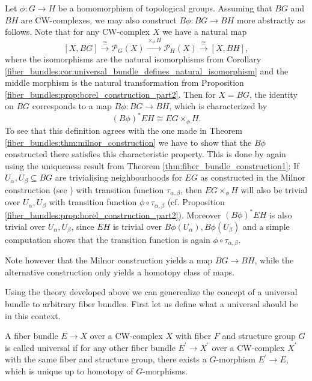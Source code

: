 \begin{remark}
    Let $\phi \colon G \to H$ be a homomorphism of topological groups. Assuming that $BG$ and $BH$ are CW-complexes, we may also construct $B \phi \colon BG \to BH$ more abstractly as follows. Note that for any CW-complex $X$ we have a natural map 
    \[
    [X,BG] \xrightarrow{\cong} \mathcal{P}_G(X) \xrightarrow{\times_\phi H} \mathcal{P}_H(X) \xrightarrow{\cong} [X,BH],
    \]
    where the isomorphisms are the natural isomorphisms from Corollary \ref{fiber_bundles:cor:universal_bundle_defines_natural_isomorphism} and the middle morphism is the natural transformation from Proposition \ref{fiber_bundles:prop:borel_construction_part2}. Then for $X = BG$, the identity on $BG$ corresponds to a map $B \phi \colon BG \to BH$, which is characterized by 
    \[
    (B \phi)^\ast EH \cong EG \times_\phi H.
    \]
    To see that this definition agrees with the one made in Theorem \ref{fiber_bundles:thm:milnor_construction} we have to show that the $B \phi$ constructed there satisfies this characteristic property. This is done by again using the uniqueness result from Theorem \ref{thm:fiber_bundle_construction1}: If $U_\alpha, U_\beta \subseteq BG$ are trivialising neighbourhoods for $EG$ as constructed in the Milnor construction (see \cite{ebert_bordism_script}) with transition function $\tau_{\alpha,\beta}$, then $EG \times_\phi H$ will also be trivial over $U_\alpha,U_\beta$ with transition function $\phi \circ \tau_{\alpha,\beta}$ (cf. Proposition \ref{fiber_bundles:prop:borel_construction_part2}). Moreover $(B \phi)^\ast EH$ is also trivial over $U_\alpha, U_\beta$, since $EH$ is trivial over $B\phi(U_\alpha), B\phi(U_\beta)$ and a simple computation shows that the transition function is again $\phi \circ \tau_{\alpha,\beta}$. 
    
    Note however that the Milnor construction yields a map $BG \to BH$, while the alternative construction only yields a homotopy class of maps.
\end{remark}

Using the theory developed above we can generealize the concept of a universal bundle to arbitrary fiber bundles. First let us define what a universal should be in this context.

\begin{definition}
    \label{fiber_bundles:def:general_universal_bundle}
    A fiber bundle $E \to X$ over a CW-complex $X$ with fiber $F$ and structure group $G$ is called universal if for any other fiber bundle $E^\prime \to X^\prime$ over a CW-complex $X^\prime$ with the same fiber and structure group, there exists a $G$-morphism $E^\prime \to E$, which is unique up to homotopy of $G$-morphisms.
\end{definition}


